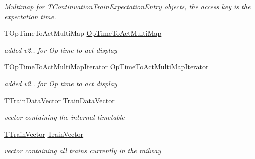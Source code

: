\begin{DoxyCompactItemize}
\begin{DoxyCompactList}\small\item\em Multimap for \mbox{\hyperlink{class_t_train_controller_1_1_t_continuation_train_expectation_entry}{T\+Continuation\+Train\+Expectation\+Entry}} objects, the access key is the expectation time. \end{DoxyCompactList}\item 
\mbox{\label{class_t_train_controller_af37800c6e9a97ebf632d011291e5070e}} 
T\+Op\+Time\+To\+Act\+Multi\+Map \mbox{\hyperlink{class_t_train_controller_af37800c6e9a97ebf632d011291e5070e}{Op\+Time\+To\+Act\+Multi\+Map}}
\begin{DoxyCompactList}\small\item\em added v2.. for Op time to act display \end{DoxyCompactList}\item 
\mbox{\label{class_t_train_controller_aa35fcf78d6d349c399c8a240508df51d}} 
T\+Op\+Time\+To\+Act\+Multi\+Map\+Iterator \mbox{\hyperlink{class_t_train_controller_aa35fcf78d6d349c399c8a240508df51d}{Op\+Time\+To\+Act\+Multi\+Map\+Iterator}}
\begin{DoxyCompactList}\small\item\em added v2.. for Op time to act display \end{DoxyCompactList}\item 
\mbox{\label{class_t_train_controller_a4e9c9e646d13f9b952434abcd97cec1b}} 
T\+Train\+Data\+Vector \mbox{\hyperlink{class_t_train_controller_a4e9c9e646d13f9b952434abcd97cec1b}{Train\+Data\+Vector}}
\begin{DoxyCompactList}\small\item\em vector containing the internal timetable \end{DoxyCompactList}\item 
\mbox{\label{class_t_train_controller_a694986ff09f8a037b8bce849e40ac119}} 
\mbox{\hyperlink{class_t_train_controller_aa9073b97736a2733dbdaf8dc52e34c24}{T\+Train\+Vector}} \mbox{\hyperlink{class_t_train_controller_a694986ff09f8a037b8bce849e40ac119}{Train\+Vector}}
\begin{DoxyCompactList}\small\item\em vector containing all trains currently in the railway \end{DoxyCompactList}\end{DoxyCompactItemize}


